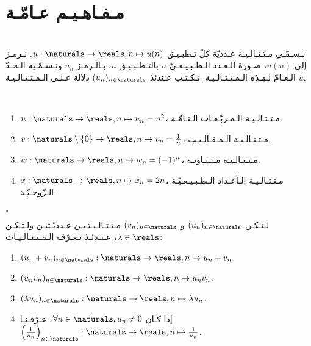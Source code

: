 \section{مـفـاهـيـم عـامّـة}%
\label{sec:sesequences:general-concepts}

\begin{definition}[الـمـتـتـالـيـة]%
    \label{def:sequences:sequence}
    \ \\%
    نـسـمّـي مـتـتـالـيـة عـدديّة كلّ تـطبـيـق
    \(u:\naturals \to \reals, n \mapsto u(n)\).
    نـرمـز إلى \(u(n)\)، صـورة الـعـدد الـطـبـيـعـيّ \(n\)
    بالتـطـبـيـق \(u\)، بـالـرمـز \(u_n\)
    ونـسـمّـيه الـحـدّ الـعـامّ لـهـذه الـمـتـتـالـيـة.
    نـكـتـب عـندئذ \((u_n)_{n \in \naturals}\)
    دلالة عـلـى الـمـتـتـالـيـة \(u\).
\end{definition}

\begin{example}\ \\%
    \vspace{-1.5\baselineskip}%
    \begin{enumerate}%
        \item \(u:\naturals \to \reals, n \mapsto u_n = n^2\)،
              مـتـتـالـيـة الـمـربّـعـات الـتـامّـة.
        \item \(v:\naturals \setminus \{0\} \to \reals, n \mapsto v_n = \frac{1}{n}\)،
              مـتـتـالـيـة الـمـقـالـيـب.
        \item \(w:\naturals \to \reals, n \mapsto w_n = (-1)^n\)،
              مـتـتـالـيـة مـتـنـاوبـة.
        \item \(x:\naturals \to \reals, n \mapsto x_n = 2n\)،
              مـتـتـالـيـة الـأعـداد الـطـبـيـعـيّـة الـزّوجـيّـة.
    \end{enumerate}
\end{example}

\begin{definition}"
    \label{def:sequences:operations}
    \ \\%
    لـتـكـن \((u_n)_{n \in \naturals}\) و \((v_n)_{n \in \naturals}\) مـتـتـالـيـتـيـن عـدديّـتيـن
    ولـتـكـن \(\lambda \in \reals\)،
    عـنـدئـذ نـعـرّف الـمـتـتـالـيـات:
    \begin{enumerate}
        \item \((u_n + v_n)_{n \in \naturals}: \naturals \to \reals, n \mapsto u_n + v_n\).
        \item \((u_n v_n)_{n \in \naturals}: \naturals \to \reals, n \mapsto u_n v_n\).
        \item \((\lambda u_n)_{n \in \naturals}: \naturals \to \reals, n \mapsto \lambda u_n\).
        \item إذا كـان \(\forall n \in \naturals, u_n \neq 0\)، عـرّفـنـا
              \(\left(\frac{1}{u_{n}}\right)_{n\in\naturals}: \naturals \to \reals, n \mapsto \frac{1}{u_n}\).
    \end{enumerate}
\end{definition}

